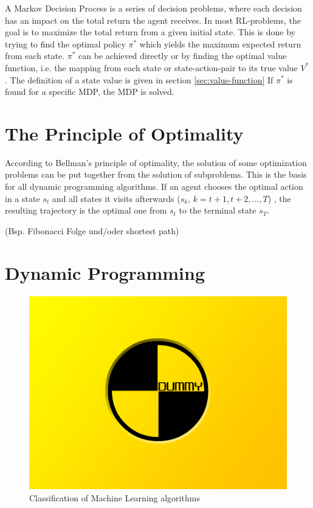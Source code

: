 A Markov Decision Process is a series of decision problems, where each decision has an impact on the total return the agent receives. In most RL-problems, the goal is to maximize the total return from a given initial state. This is done by trying to find the optimal policy $\pi^*$ which yields the maximum expected return from each state. $\pi^*$ can be achieved directly or by finding the optimal value function, i.e. the mapping from each state or state-action-pair to its true value $V^*$. The definition of a state value is given in section \ref{sec:value-function} If $\pi^*$ is found for a specific MDP, the MDP is solved.

\section{The Principle of Optimality}
\label{sec:optimality}

According to Bellman's principle of optimality, the solution of some optimization problems can be put together from the solution of subproblems. This is the basis for all dynamic programming algorithms. If an agent chooses the optimal action in a state $s_t$ and all states it visits afterwards ($s_k$, $k=t+1, t+2, ...,T$) , the resulting trajectory is the optimal one from $s_t$ to the terminal state $s_T$.

(Bsp. Fibonacci Folge und/oder shortest path)

\section{Dynamic Programming}
\label{chapter3}

\begin{figure}[h]
	\includegraphics[width=\textwidth]{src/pics/dummy.jpg}
	\caption{Classification of Machine Learning algorithms}
	\label{fig:classification_ml} 
\end{figure}

